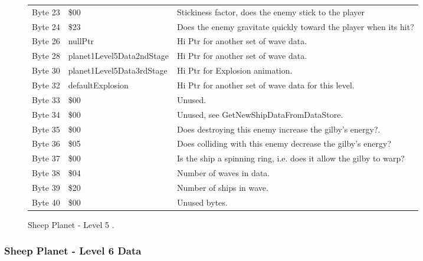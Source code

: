 \begin{figure}[H]
{\begin{adjustbox}{width=12cm}
\begin{tabular}{lll}
 Byte 23 & \$00                       & Stickiness factor, does the enemy stick to the player              \\
 Byte 24 & \$23                       & Does the enemy gravitate quickly toward the player when its hit?   \\
 Byte 26 & nullPtr                   & Hi Ptr for another set of wave data.                               \\
 Byte 28 & planet1Level5Data2ndStage & Hi Ptr for another set of wave data.                               \\
 Byte 30 & planet1Level5Data3rdStage & Hi Ptr for Explosion animation.                                    \\
 Byte 32 & defaultExplosion          & Hi Ptr for another set of wave data for this level.                \\
 Byte 33 & \$00                       & Unused.                                                            \\
 Byte 34 & \$00                       & Unused, see GetNewShipDataFromDataStore.                           \\
 Byte 35 & \$00                       & Does destroying this enemy increase the gilby's energy?.           \\
 Byte 36 & \$05                       & Does colliding with this enemy decrease the gilby's energy?        \\
 Byte 37 & \$00                       & Is the ship a spinning ring, i.e. does it allow the gilby to warp? \\
 Byte 38 & \$04                       & Number of waves in data.                                           \\
 Byte 39 & \$20                       & Number of ships in wave.                                           \\
 Byte 40 & \$00                       & Unused bytes.                                                      \\
\bottomrule
\end{tabular}

  \end{adjustbox}

  }\caption*{Sheep Planet - Level 5
.}
\end{figure}

\clearpage
\subsubsection{Sheep Planet - Level 6 Data}

